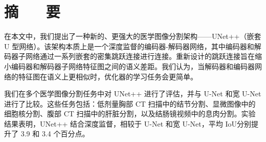\section*{ \centering 摘 ~~ 要}

\vskip0.5cm

在本文中，我们提出了一种新的、更强大的医学图像分割架构——UNet++（嵌套 U 型网络）。该架构本质上是一个深度监督的编码器-解码器网络，其中编码器和解码器子网络通过一系列嵌套的密集跳跃连接进行连接。重新设计的跳跃连接旨在缩小编码器和解码器子网络特征图之间的语义差距。我们认为，当解码器和编码器网络的特征图在语义上更相似时，优化器的学习任务会更简单。  

我们在多个医学图像分割任务中对 UNet++ 进行了评估，并与 U-Net 和宽 U-Net 进行了比较。这些任务包括：低剂量胸部 CT 扫描中的结节分割、显微图像中的细胞核分割、腹部 CT 扫描中的肝脏分割，以及结肠镜视频中的息肉分割。实验结果表明，UNet++ 结合深度监督，相较于 U-Net 和宽 U-Net，平均 IoU分别提升了 3.9 和 3.4 个百分点。
\vskip0.5cm

